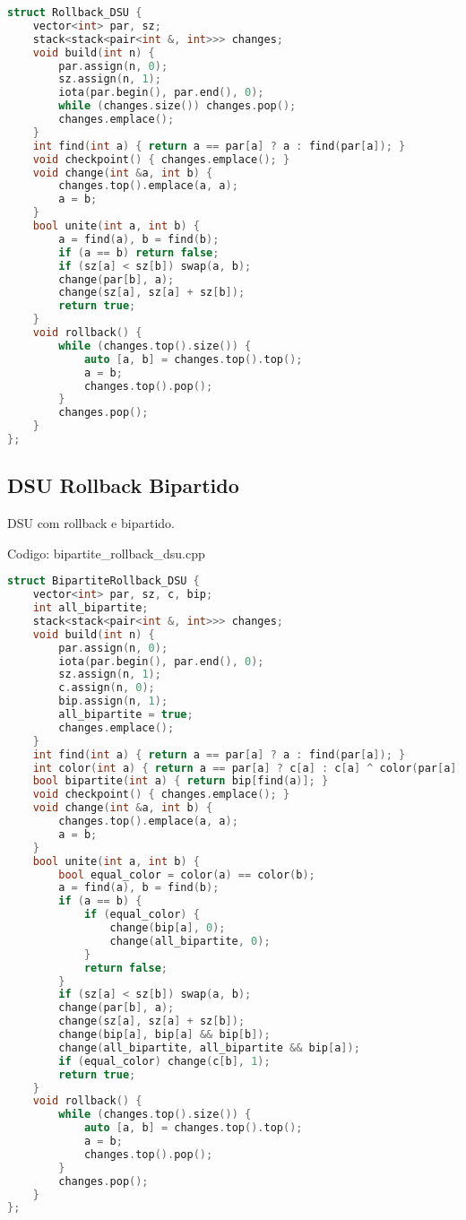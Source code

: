 \documentclass[10pt, a4paper, oneside]{book}
\begin{document}
\begin{lstlisting}[language=C++]
struct Rollback_DSU {
    vector<int> par, sz;
    stack<stack<pair<int &, int>>> changes;
    void build(int n) {
        par.assign(n, 0);
        sz.assign(n, 1);
        iota(par.begin(), par.end(), 0);
        while (changes.size()) changes.pop();
        changes.emplace();
    }
    int find(int a) { return a == par[a] ? a : find(par[a]); }
    void checkpoint() { changes.emplace(); }
    void change(int &a, int b) {
        changes.top().emplace(a, a);
        a = b;
    }
    bool unite(int a, int b) {
        a = find(a), b = find(b);
        if (a == b) return false;
        if (sz[a] < sz[b]) swap(a, b);
        change(par[b], a);
        change(sz[a], sz[a] + sz[b]);
        return true;
    }
    void rollback() {
        while (changes.top().size()) {
            auto [a, b] = changes.top().top();
            a = b;
            changes.top().pop();
        }
        changes.pop();
    }
};\end{lstlisting}
\hfill

\subsection{DSU Rollback Bipartido}


DSU com rollback e bipartido.

\hfill

Codigo: bipartite\_rollback\_dsu.cpp

\begin{lstlisting}[language=C++]
struct BipartiteRollback_DSU {
    vector<int> par, sz, c, bip;
    int all_bipartite;
    stack<stack<pair<int &, int>>> changes;
    void build(int n) {
        par.assign(n, 0);
        iota(par.begin(), par.end(), 0);
        sz.assign(n, 1);
        c.assign(n, 0);
        bip.assign(n, 1);
        all_bipartite = true;
        changes.emplace();
    }
    int find(int a) { return a == par[a] ? a : find(par[a]); }
    int color(int a) { return a == par[a] ? c[a] : c[a] ^ color(par[a]); }
    bool bipartite(int a) { return bip[find(a)]; }
    void checkpoint() { changes.emplace(); }
    void change(int &a, int b) {
        changes.top().emplace(a, a);
        a = b;
    }
    bool unite(int a, int b) {
        bool equal_color = color(a) == color(b);
        a = find(a), b = find(b);
        if (a == b) {
            if (equal_color) {
                change(bip[a], 0);
                change(all_bipartite, 0);
            }
            return false;
        }
        if (sz[a] < sz[b]) swap(a, b);
        change(par[b], a);
        change(sz[a], sz[a] + sz[b]);
        change(bip[a], bip[a] && bip[b]);
        change(all_bipartite, all_bipartite && bip[a]);
        if (equal_color) change(c[b], 1);
        return true;
    }
    void rollback() {
        while (changes.top().size()) {
            auto [a, b] = changes.top().top();
            a = b;
            changes.top().pop();
        }
        changes.pop();
    }
};\end{lstlisting}
\hfill
\end{document}
